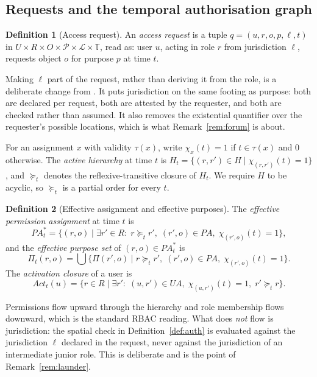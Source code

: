 \documentclass[11pt]{article}
\theoremstyle{definition}
\newtheorem{definition}{Definition}
\theoremstyle{plain}
\theoremstyle{remark}
\newcommand{\Act}{\mathit{Act}}
\newcommand{\Tdom}{\mathbb{T}}
\newcommand{\Ldom}{\mathcal{L}}
\newcommand{\Pdom}{\mathcal{P}}
\begin{document}
\subsection{Requests and the temporal authorisation graph}

\begin{definition}[Access request]
An \emph{access request} is a tuple $q = (u, r, o, p, \ell, t)$ in
$U \times R \times O \times \Pdom \times \Ldom \times \Tdom$, read as: user $u$,
acting in role $r$ from jurisdiction $\ell$, requests object $o$ for purpose $p$
at time $t$.
\end{definition}

Making $\ell$ part of the request, rather than deriving it from the role, is a
deliberate change from \citet{kokash2026compliance}. It puts jurisdiction on
the same footing as purpose: both are declared per request, both are attested by
the requester, and both are checked rather than assumed. It also removes the
existential quantifier over the requester's possible locations, which is what
Remark~\ref{rem:forum} is about.

For an assignment $x$ with validity $\tau(x)$, write
$\chi_x(t) = 1$ if $t \in \tau(x)$ and $0$ otherwise. The
\emph{active hierarchy} at time $t$ is
$H_t = \{(r,r') \in H \mid \chi_{(r,r')}(t) = 1\}$, and $\succeq_t$ denotes the
reflexive-transitive closure of $H_t$. We require $H$ to be acyclic, so
$\succeq_t$ is a partial order for every $t$.

\begin{definition}[Effective assignment and effective purposes]
\label{def:effective}
The \emph{effective permission assignment} at time $t$ is
\[
  PA^{*}_t = \bigl\{ (r,o) \;\big|\;
    \exists r' \in R:\; r \succeq_t r',\;
    (r',o) \in PA,\; \chi_{(r',o)}(t) = 1 \bigr\},
\]
and the \emph{effective purpose set} of $(r,o) \in PA^{*}_t$ is
\[
  \Pi_t(r,o) = \bigcup \bigl\{ \Pi(r',o) \;\big|\;
    r \succeq_t r',\; (r',o) \in PA,\; \chi_{(r',o)}(t) = 1 \bigr\}.
\]
The \emph{activation closure} of a user is
\[
  \Act_t(u) = \bigl\{ r \in R \;\big|\;
    \exists r' :\; (u,r') \in UA,\; \chi_{(u,r')}(t) = 1,\; r' \succeq_t r
  \bigr\}.
\]
\end{definition}

Permissions flow upward through the hierarchy and role membership flows
downward, which is the standard RBAC reading. What does \emph{not} flow is
jurisdiction: the spatial check in Definition~\ref{def:auth} is evaluated
against the jurisdiction $\ell$ declared in the request, never against the
jurisdiction of an intermediate junior role. This is deliberate and is the point
of Remark~\ref{rem:launder}.
\end{document}
